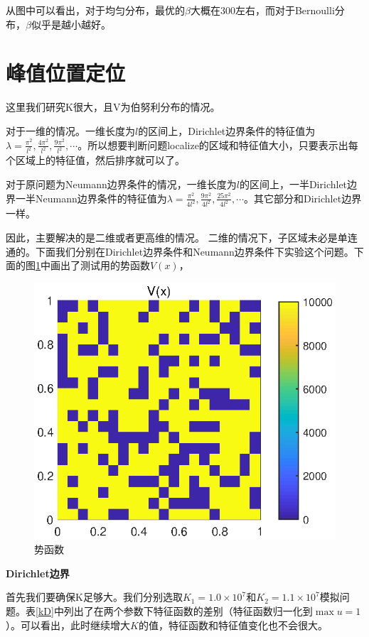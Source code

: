 \documentclass[12pt,a4paper]{article}
\begin{document}
从图中可以看出，对于均匀分布，最优的$\beta$大概在300左右，而对于Bernoulli分布，$\beta$似乎是越小越好。

\newpage

\section{峰值位置定位}\label{locate}

这里我们研究K很大，且V为伯努利分布的情况。

对于一维的情况。一维长度为$l$的区间上，Dirichlet边界条件的特征值为$\lambda = \frac{\pi^2}{l^2}, \frac{4 \pi^2}{l^2}, \frac{9 \pi^2}{l^2}, \cdots $。所以想要判断问题localize的区域和特征值大小，只要表示出每个区域上的特征值，然后排序就可以了。

对于原问题为Neumann边界条件的情况，一维长度为$l$的区间上，一半Dirichlet边界一半Neumann边界条件的特征值为$\lambda = \frac{\pi^2}{4 l^2}, \frac{9 \pi^2}{4 l^2}, \frac{25 \pi^2}{4 l^2}, \cdots $。其它部分和Dirichlet边界一样。

因此，主要解决的是二维或者更高维的情况。{\color{red} 二维的情况下，子区域未必是单连通的。}下面我们分别在Dirichlet边界条件和Neumann边界条件下实验这个问题。下面的图\ref{V}中画出了测试用的势函数$V(x)$，
\begin{figure}[htbp]
\centering
\includegraphics[width=0.4\linewidth]{locate/V}
\caption{势函数}
\label{V}
\end{figure}

\textbf{Dirichlet边界}

首先我们要确保K足够大。我们分别选取$K_1=1.0 \times 10^7$和$K_2=1.1 \times 10^7$模拟问题。表\ref{kD}中列出了在两个参数下特征函数的差别（特征函数归一化到$\max u = 1$）。可以看出，此时继续增大$K$的值，特征函数和特征值变化也不会很大。
\end{document}
